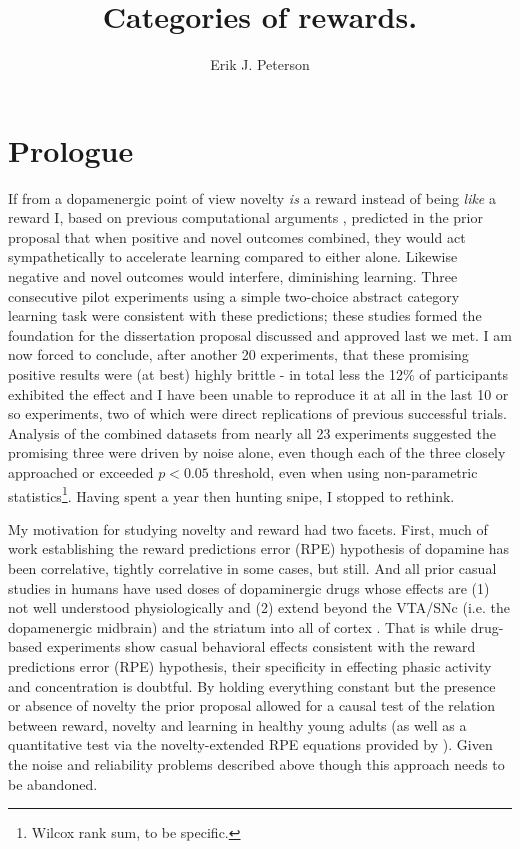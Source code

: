 \documentclass[doc,12pt]{apa}        %
\title{Categories of rewards.}
\author{Erik J. Peterson} \affiliation{Dept. of Psychology \\ Colorado State University \\ Fort Collins, CO}
\begin{document}
 
\maketitle

\section{Prologue} %
\label{sec:prologue}
If from a dopamenergic point of view novelty \emph{is} a reward instead of being \emph{like} a reward I, based on previous computational arguments \cite{Kakade:2002p6414}, predicted in the prior proposal that when positive and novel outcomes combined, they would act sympathetically to accelerate learning compared to either alone.  Likewise negative and novel outcomes would interfere, diminishing learning. Three consecutive pilot experiments using a simple two-choice abstract category learning task were consistent with these predictions; these studies formed the foundation for the dissertation proposal discussed and approved last we met.  I am now forced to conclude, after another 20 experiments, that these promising positive results were (at best) highly brittle - in total less the 12\% of participants exhibited the effect and I have been unable to reproduce it at all in the last 10 or so experiments, two of which were direct replications of previous successful trials.  Analysis of the combined datasets from nearly all 23 experiments suggested the promising three were driven by noise alone, even though each of the three closely approached or exceeded $p < 0.05$ threshold, even when using non-parametric statistics\footnote{Wilcox rank sum, to be specific.}.  Having spent a year then hunting snipe, I stopped to rethink. 

My motivation for studying novelty and reward had two facets.  First, much of work establishing the reward predictions error (RPE) hypothesis of dopamine has been correlative, tightly correlative in some cases, but still.  And all prior casual studies in humans have used doses of dopaminergic drugs whose effects are (1) not well understood physiologically and (2) extend beyond the VTA/SNc (i.e. the dopamenergic midbrain) and the striatum into all of cortex \cite{Menon:2007p6529,Pizzagalli:2008p6521,Schonberg:2009p6669}.  That is while drug-based experiments show casual behavioral effects consistent with the reward predictions error (RPE) hypothesis, their specificity in effecting phasic activity and concentration is doubtful.  By holding everything constant but the presence or absence of novelty the prior proposal allowed for a causal test of the relation between reward, novelty and learning in healthy young adults (as well as a quantitative test via the novelty-extended RPE equations provided by ).  Given the noise and reliability problems described above though this approach needs to be abandoned.
\end{document}
